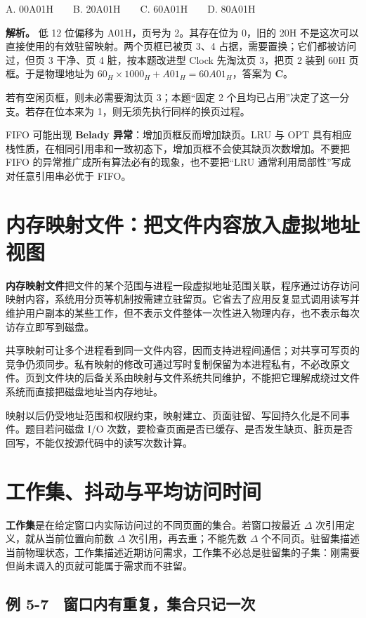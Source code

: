 A. 00A01H　　B. 20A01H　　C. 60A01H　　D. 80A01H


\textbf{解析。} 低 12 位偏移为 A01H，页号为 2。其存在位为 0，旧的 20H 不是这次可以直接使用的有效驻留映射。两个页框已被页 3、4 占据，需要置换；它们都被访问过，但页 3 干净、页 4 脏，按本题改进型 Clock 先淘汰页 3，把页 2 装到 60H 页框。于是物理地址为 \(60_H\times1000_H+A01_H=60A01_H\)，答案为 \textbf{C}。

若有空闲页框，则未必需要淘汰页 3；本题``固定 2 个且均已占用''决定了这一分支。若存在位本来为 1，则无须先执行同样的换页过程。

FIFO 可能出现 \textbf{Belady 异常}：增加页框反而增加缺页。LRU 与 OPT 具有相应栈性质，在相同引用串和一致初态下，增加页框不会使其缺页次数增加。不要把 FIFO 的异常推广成所有算法必有的现象，也不要把``LRU 通常利用局部性''写成对任意引用串必优于 FIFO。

\section{内存映射文件：把文件内容放入虚拟地址视图}\label{os-5-10}

\textbf{内存映射文件}把文件的某个范围与进程一段虚拟地址范围关联，程序通过访存访问映射内容，系统用分页等机制按需建立驻留页。它省去了应用反复显式调用读写并维护用户副本的某些工作，但不表示文件整体一次性进入物理内存，也不表示每次访存立即写到磁盘。

共享映射可让多个进程看到同一文件内容，因而支持进程间通信；对共享可写页的竞争仍须同步。私有映射的修改可通过写时复制保留为本进程私有，不必改原文件。页到文件块的后备关系由映射与文件系统共同维护，不能把它理解成绕过文件系统而直接把磁盘地址当内存地址。

映射以后仍受地址范围和权限约束，映射建立、页面驻留、写回持久化是不同事件。题目若问磁盘 I/O 次数，要检查页面是否已缓存、是否发生缺页、脏页是否回写，不能仅按源代码中的读写次数计算。

\section{工作集、抖动与平均访问时间}\label{os-5-11}

\textbf{工作集}是在给定窗口内实际访问过的不同页面的集合。若窗口按最近 \(\Delta\) 次引用定义，就从当前位置向前数 \(\Delta\) 次引用，再去重；不能先数 \(\Delta\) 个不同页。驻留集描述当前物理状态，工作集描述近期访问需求，工作集不必总是驻留集的子集：刚需要但尚未调入的页就可能属于需求而不驻留。

\subsection{例 5-7　窗口内有重复，集合只记一次}\label{os-ex5-7}

